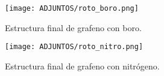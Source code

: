 \begin{figure}[!h]
    \centering
    \texttt{[image: ADJUNTOS/roto\_boro.png]}
    \caption{Estructura final de grafeno con boro.}
    \label{fig:4.12}
\end{figure}

\begin{figure}[!h]
    \centering
    \texttt{[image: ADJUNTOS/roto\_nitro.png]}
    \caption{Estructura final de grafeno con nitrógeno.}
    \label{fig:4.13}
\end{figure}







